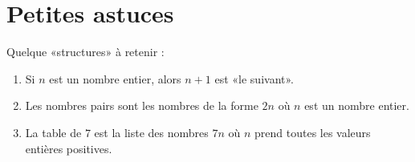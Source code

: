 \section{Petites astuces}

Quelque «structures» à retenir :
\begin{enumerate}
    \item
        Si \( n\) est un nombre entier, alors \( n+1\) est «le suivant».
    \item
        Les nombres pairs sont les nombres de la forme \( 2n\) où \( n\) est un nombre entier.
    \item
        La table de \( 7\) est la liste des nombres \( 7n\) où \( n\) prend toutes les valeurs entières positives.
\end{enumerate}


 
